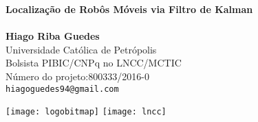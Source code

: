\documentclass[a0,portrait]{a0poster}
\begin{document}


\begin{minipage}[b]{0.75\linewidth}
\veryHuge \color{NavyBlue} \textbf{Localização de Robôs Móveis via Filtro de Kalman} \color{Black}\\\\ %
\huge \textbf{Hiago Riba Guedes}\\[0.5cm] %
\huge Universidade Católica de Petrópolis\\[0.4cm] %
\huge {Bolsista PIBIC/CNPq no LNCC/MCTIC}\\
\huge{Número do projeto:800333/2016-0}\\
\Large \texttt{hiagoguedes94@gmail.com}

\end{minipage}
%
\begin{center}
\texttt{[image: logobitmap]}
\hspace{34cm}
\texttt{[image: lncc]}
\end{center}


\vspace{1cm} %

\end{document}
